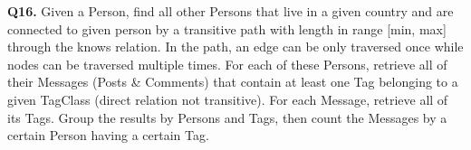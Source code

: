 \textbf{Q16.}
Given a Person, find all other Persons that live in a given country and
are connected to given person by a transitive path with length in range
{[}min, max{]} through the knows relation.
In the path, an edge can be only traversed once while nodes can be
traversed multiple times.
For each of these Persons, retrieve all of their Messages (Posts \&
Comments) that contain at least one Tag belonging to a given TagClass
(direct relation not transitive). For each Message, retrieve all of its
Tags.
Group the results by Persons and Tags, then count the Messages by a
certain Person having a certain Tag.
